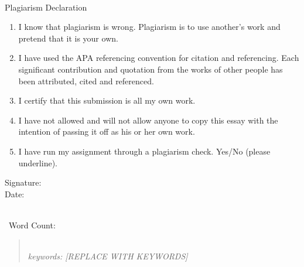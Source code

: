 \documentclass[11pt]{article} %
\begin{document}
\begin{titlepage}
		\HRule\\[0.5cm]
		
		Plagiarism Declaration
		\begin{flushleft}
			\begin{enumerate}
				\item I know that plagiarism is wrong. Plagiarism is to use another’s work and pretend that it is your own.
				\item I have used the APA referencing convention for citation and referencing. Each significant contribution and quotation from the works of other people has been attributed, cited and referenced.
				\item I certify that this submission is all my own work.
				\item I have not allowed and will not allow anyone to copy this essay with the intention of passing it off as his or her own work.
				\item I have run my assignment through a plagiarism check. Yes/No (please underline).\\ [0.5cm]
			\end{enumerate}
			Signature: \\
			Date:\\
		\end{flushleft}
	
		\HRule\\[0.4cm]
		
		
		{\large\ Word Count: } 
		
		
		
		
	\end{titlepage}
	

	
	\begin{abstract}
		 \lipsum[1-1]  \\ %
		 

		{{\it keywords:  [REPLACE WITH KEYWORDS]}}
	\end{abstract}
\end{document}
